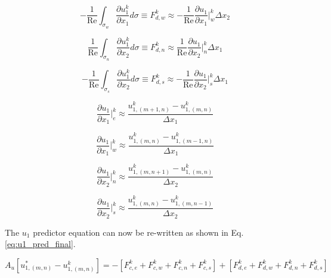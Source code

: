 \documentclass[10pt, letterpaper]{article}
\begin{document}
\begin{equation}
  - \frac{1}{\text{Re}}\int_{\sigma_{w}}\frac{\partial{u_{1}^{k}}}{\partial{x_{1}}}d\sigma \equiv
  F_{d,w}^{k} \approx - \frac{1}{\text{Re}}\frac{\partial{u_{1}}}{\partial{x_{1}}}\bigg|_{w}^{k}\Delta{x_{2}}
  \label{eq:u1_Fdw}
\end{equation}

\begin{equation}
  \frac{1}{\text{Re}}\int_{\sigma_{n}}\frac{\partial{u_{1}^{k}}}{\partial{x_{2}}}d\sigma \equiv
  F_{d,n}^{k} \approx \frac{1}{\text{Re}}\frac{\partial{u_{1}}}{\partial{x_{2}}}\bigg|_{n}^{k}\Delta{x_{1}}
  \label{eq:u1_Fdn}
\end{equation}

\begin{equation}
  - \frac{1}{\text{Re}}\int_{\sigma_{s}}\frac{\partial{u_{1}^{k}}}{\partial{x_{2}}}d\sigma \equiv
  F_{d,s}^{k} \approx - \frac{1}{\text{Re}}\frac{\partial{u_{1}}}{\partial{x_{2}}}\bigg|_{s}^{k}\Delta{x_{1}}
  \label{eq:u1_Fds}
\end{equation}

\begin{equation}
  \frac{\partial{u_{1}}}{\partial{x_{1}}}\bigg|_{e}^{k}\approx
  \frac{u_{1,(m+1,n)}^{k} - u_{1,(m,n)}^{k}}{\Delta{x_{1}}}
  \label{eq:u1_du1dx1_e}
\end{equation}

\begin{equation}
  \frac{\partial{u_{1}}}{\partial{x_{1}}}\bigg|_{w}^{k}\approx
  \frac{u_{1,(m,n)}^{k} - u_{1,(m-1,n)}^{k}}{\Delta{x_{1}}}
  \label{eq:u1_du1dx1_w}
\end{equation}

\begin{equation}
  \frac{\partial{u_{1}}}{\partial{x_{2}}}\bigg|_{n}^{k}\approx
  \frac{u_{1,(m,n+1)}^{k} - u_{1,(m,n)}^{k}}{\Delta{x_{2}}}
  \label{eq:u1_du1dx2_n}
\end{equation}

\begin{equation}
  \frac{\partial{u_{1}}}{\partial{x_{2}}}\bigg|_{s}^{k}\approx
  \frac{u_{1,(m,n)}^{k} - u_{1,(m,n-1)}^{k}}{\Delta{x_{2}}}
  \label{eq:u1_du1dx2_s}
\end{equation}

The $u_{1}$ predictor equation can now be re-written as shown in Eq. \ref{eq:u1_pred_final}.

\begin{equation}
  \boxed{
    A_{u}[u_{1,(m,n)}^{*} - u_{1,(m,n)}^{k}] = - [F_{c,e}^{k} + F_{c,w}^{k} + F_{c,n}^{k} + F_{c,s}^{k}] + [F_{d,e}^{k} + F_{d,w}^{k} + F_{d,n}^{k} + F_{d,s}^{k}]
  }
  \label{eq:u1_pred_final}
\end{equation}
\end{document}
